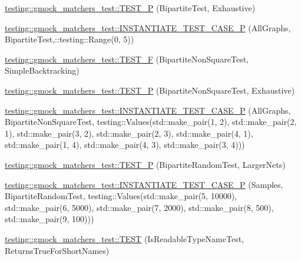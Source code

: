 \begin{DoxyCompactItemize}
\item 
\hyperlink{namespacetesting_1_1gmock__matchers__test_a20589d957fcfe5399e249084dbc23e82}{testing\+::gmock\+\_\+matchers\+\_\+test\+::\+T\+E\+S\+T\+\_\+P} (Bipartite\+Test, Exhaustive)
\item 
\hyperlink{namespacetesting_1_1gmock__matchers__test_a3ca71a91f2b60ab08922acb7da0f8df0}{testing\+::gmock\+\_\+matchers\+\_\+test\+::\+I\+N\+S\+T\+A\+N\+T\+I\+A\+T\+E\+\_\+\+T\+E\+S\+T\+\_\+\+C\+A\+S\+E\+\_\+P} (All\+Graphs, Bipartite\+Test,\+::testing\+::\+Range(0, 5))
\item 
\hyperlink{namespacetesting_1_1gmock__matchers__test_a7d2395b1cb6a90bdc8d46ae06f99f6c7}{testing\+::gmock\+\_\+matchers\+\_\+test\+::\+T\+E\+S\+T\+\_\+F} (Bipartite\+Non\+Square\+Test, Simple\+Backtracking)
\item 
\hyperlink{namespacetesting_1_1gmock__matchers__test_a3ac913ed55a7ac2636ae7bfce04296e9}{testing\+::gmock\+\_\+matchers\+\_\+test\+::\+T\+E\+S\+T\+\_\+P} (Bipartite\+Non\+Square\+Test, Exhaustive)
\item 
\hyperlink{namespacetesting_1_1gmock__matchers__test_a64ef722e930c3088ddea704ac20194b5}{testing\+::gmock\+\_\+matchers\+\_\+test\+::\+I\+N\+S\+T\+A\+N\+T\+I\+A\+T\+E\+\_\+\+T\+E\+S\+T\+\_\+\+C\+A\+S\+E\+\_\+P} (All\+Graphs, Bipartite\+Non\+Square\+Test, testing\+::\+Values(std\+::make\+\_\+pair(1, 2), std\+::make\+\_\+pair(2, 1), std\+::make\+\_\+pair(3, 2), std\+::make\+\_\+pair(2, 3), std\+::make\+\_\+pair(4, 1), std\+::make\+\_\+pair(1, 4), std\+::make\+\_\+pair(4, 3), std\+::make\+\_\+pair(3, 4)))
\item 
\hyperlink{namespacetesting_1_1gmock__matchers__test_ace6351a5a34b746491458140b06534ed}{testing\+::gmock\+\_\+matchers\+\_\+test\+::\+T\+E\+S\+T\+\_\+P} (Bipartite\+Random\+Test, Larger\+Nets)
\item 
\hyperlink{namespacetesting_1_1gmock__matchers__test_a857f48ffb1fc6f5ce61aec79b5c94da8}{testing\+::gmock\+\_\+matchers\+\_\+test\+::\+I\+N\+S\+T\+A\+N\+T\+I\+A\+T\+E\+\_\+\+T\+E\+S\+T\+\_\+\+C\+A\+S\+E\+\_\+P} (Samples, Bipartite\+Random\+Test, testing\+::\+Values(std\+::make\+\_\+pair(5, 10000), std\+::make\+\_\+pair(6, 5000), std\+::make\+\_\+pair(7, 2000), std\+::make\+\_\+pair(8, 500), std\+::make\+\_\+pair(9, 100)))
\item 
\hyperlink{namespacetesting_1_1gmock__matchers__test_aef0bf5f855b1e75c63ec45408b5a23ba}{testing\+::gmock\+\_\+matchers\+\_\+test\+::\+T\+E\+ST} (Is\+Readable\+Type\+Name\+Test, Returns\+True\+For\+Short\+Names)
\item 

\end{DoxyCompactItemize}
